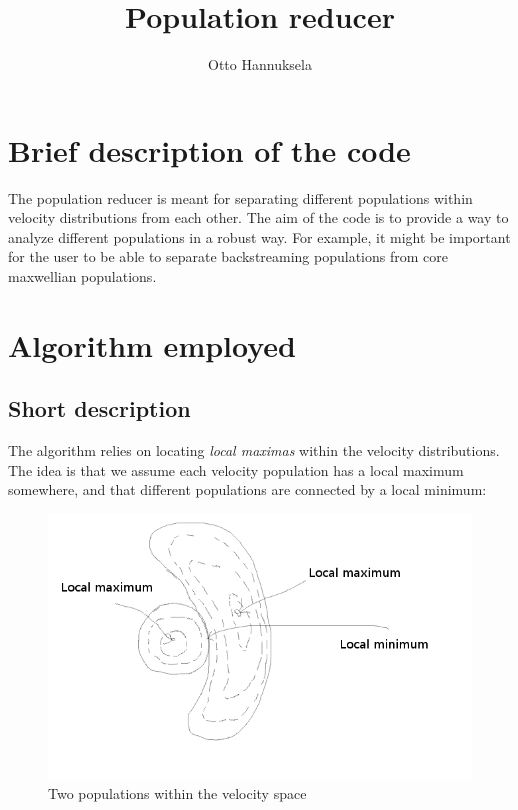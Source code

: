 \documentclass[a4paper,10pt]{article}
\title{Population reducer}
\author{Otto Hannuksela}
\begin{document}
\maketitle

\section{Brief description of the code}

The population reducer is meant for separating different populations within velocity distributions from each other. The aim of the code is to provide a way to analyze different populations 
in a robust way. For example, it might be important for the user to be able to separate backstreaming populations from core maxwellian populations.


\section{Algorithm employed}

\subsection{Short description}

The algorithm relies on locating \emph{local maximas} within the velocity distributions. The idea is that we assume each velocity population has a local maximum somewhere, and that 
different populations are connected by a local minimum:

\begin{figure}[H]
 \includegraphics[width=\textwidth]{reducepopulation.png}
 \caption{Two populations within the velocity space}
 \label{fig:populationcode}
\end{figure}
\end{document}
